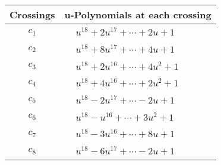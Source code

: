 \documentclass[1p]{elsarticle_modified}
\theoremstyle{definition}
\begin{document}
\begin{tabular}{m{50pt}|m{274pt}}
Crossings & \hspace{64pt}u-Polynomials at each crossing \\
\hline $$\begin{aligned}c_{1}\end{aligned}$$&$\begin{aligned}
&u^{18}+2 u^{17}+\cdots+2 u+1
\end{aligned}$\\
\hline $$\begin{aligned}c_{2}\end{aligned}$$&$\begin{aligned}
&u^{18}+8 u^{17}+\cdots+4 u+1
\end{aligned}$\\
\hline $$\begin{aligned}c_{3}\end{aligned}$$&$\begin{aligned}
&u^{18}+2 u^{16}+\cdots+4 u^2+1
\end{aligned}$\\
\hline $$\begin{aligned}c_{4}\end{aligned}$$&$\begin{aligned}
&u^{18}+4 u^{16}+\cdots+2 u^2+1
\end{aligned}$\\
\hline $$\begin{aligned}c_{5}\end{aligned}$$&$\begin{aligned}
&u^{18}-2 u^{17}+\cdots-2 u+1
\end{aligned}$\\
\hline $$\begin{aligned}c_{6}\end{aligned}$$&$\begin{aligned}
&u^{18}- u^{16}+\cdots+3 u^2+1
\end{aligned}$\\
\hline $$\begin{aligned}c_{7}\end{aligned}$$&$\begin{aligned}
&u^{18}-3 u^{16}+\cdots+8 u+1
\end{aligned}$\\
\hline $$\begin{aligned}c_{8}\end{aligned}$$&$\begin{aligned}
&u^{18}-6 u^{17}+\cdots-2 u+1
\end{aligned}$\\

\end{tabular}
\end{document}
